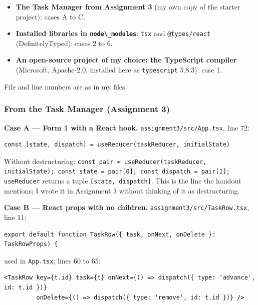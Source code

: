 \documentclass[
  10pt,
]{article}
\newcommand{\passthrough}[1]{#1}
\providecommand{\tightlist}{%
  \setlength{\itemsep}{0pt}\setlength{\parskip}{0pt}}
\begin{document}
\begin{itemize}
\tightlist
\item
  \textbf{The Task Manager from Assignment 3} (my own copy of the
  starter project): cases A to C.
\item
  \textbf{Installed libraries in
  \passthrough{\lstinline!node\_modules!}}:
  \passthrough{\lstinline!tsx!} and
  \passthrough{\lstinline!@types/react!} (DefinitelyTyped): cases 2 to
  6.
\item
  \textbf{An open-source project of my choice: the TypeScript compiler}
  (Microsoft, Apache-2.0, installed here as
  \passthrough{\lstinline!typescript!} 5.8.3): case 1.
\end{itemize}

File and line numbers are as in my files.

\hypertarget{from-the-task-manager-assignment-3}{%
\subsubsection{From the Task Manager (Assignment
3)}\label{from-the-task-manager-assignment-3}}

\textbf{Case A --- Form 1 with a React hook.}
\passthrough{\lstinline!assignment3/src/App.tsx!}, line 72:

\begin{lstlisting}
const [state, dispatch] = useReducer(taskReducer, initialState)
\end{lstlisting}

Without destructuring:
\passthrough{\lstinline!const pair = useReducer(taskReducer, initialState); const state = pair[0]; const dispatch = pair[1];!}
\passthrough{\lstinline!useReducer!} returns a tuple
\passthrough{\lstinline![state, dispatch]!}. This is the line the
handout mentions; I wrote it in Assignment 3 without thinking of it as
destructuring.

\textbf{Case B --- React props with no children.}
\passthrough{\lstinline!assignment3/src/TaskRow.tsx!}, line 11:

\begin{lstlisting}
export default function TaskRow({ task, onNext, onDelete }: TaskRowProps) {
\end{lstlisting}

used in \passthrough{\lstinline!App.tsx!}, lines 60 to 65:

\begin{lstlisting}
<TaskRow key={t.id} task={t} onNext={() => dispatch({ type: 'advance', id: t.id })}
         onDelete={() => dispatch({ type: 'remove', id: t.id })} />
\end{lstlisting}
\end{document}
